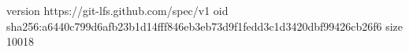 version https://git-lfs.github.com/spec/v1
oid sha256:a6440c799d6afb23b1d14fff846eb3eb73d9f1fedd3c1d3420dbf99426cb26f6
size 10018
